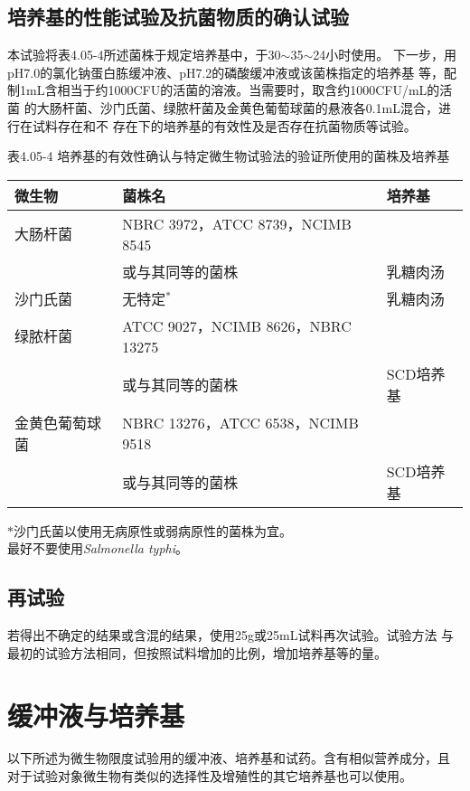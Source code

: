 \documentclass[11pt,a4paper]{article}
\newenvironment{SC}{%
  \CJKfamily{gbsn}%
  \CJKtilde
  \CJKnospace}{}
\begin{document}
\begin{CJK}{UTF8}{}
\begin{SC}
\subsection*{培养基的性能试验及抗菌物质的确认试验}
本试验将表4.05-4所述菌株于规定培养基中，于30$\sim$35$\sim$24小时使用。
下一步，用pH7.0的氯化钠蛋白胨缓冲液、pH7.2的磷酸缓冲液或该菌株指定的培养基
等，配制1mL含相当于约1000CFU的活菌的溶液。当需要时，取含约1000CFU/mL的活菌
的大肠杆菌、沙门氏菌、绿脓杆菌及金黄色葡萄球菌的悬液各0.1mL混合，进行在试料存在和不
存在下的培养基的有效性及是否存在抗菌物质等试验。\endnote{}\\
\begin{table}[htb]
\begin{center}
表4.05-4 培养基的有效性确认与特定微生物试验法的验证所使用的菌株及培养基\\
\begin{tabular}{l|p{3 in}|l}
\hline
微生物&菌株名&培养基\\
\hline
大肠杆菌&NBRC 3972，ATCC 8739，NCIMB 8545\\
&或与其同等的菌株&乳糖肉汤\\
\hline
沙门氏菌&无特定$^{\ast}$&乳糖肉汤\\
\hline
绿脓杆菌&ATCC 9027，NCIMB 8626，NBRC 13275\\
&或与其同等的菌株&SCD培养基\\
\hline
金黄色葡萄球菌&NBRC 13276，ATCC 6538，NCIMB 9518\\
&或与其同等的菌株&SCD培养基\\
\hline
\end{tabular}
\end{center}
$\ast$沙门氏菌以使用无病原性或弱病原性的菌株为宜。\\
最好不要使用\textsl{Salmonella typhi}。\endnote{}\\
\end{table}

\subsection*{再试验}
若得出不确定的结果或含混的结果，使用25g或25mL试料再次试验。试验方法
与最初的试验方法相同，但按照试料增加的比例，增加培养基等的量。\\

\setcounter{subsubsection}{0}
\renewcommand{\labelenumi}{（\roman{enumi}）}
\section{缓冲液与培养基\endnote{}}
以下所述为微生物限度试验用的缓冲液、培养基和试药。含有相似营养成分，且
对于试验对象微生物有类似的选择性及增殖性的其它培养基也可以使用。\\

\end{SC}
\end{CJK}
\end{document}
